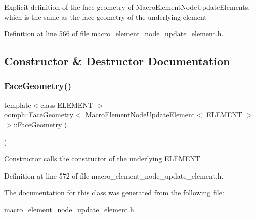 Explicit definition of the face geometry of Macro\+Element\+Node\+Update\+Elements, which is the same as the face geometry of the underlying element 

Definition at line 566 of file macro\+\_\+element\+\_\+node\+\_\+update\+\_\+element.\+h.



\subsection{Constructor \& Destructor Documentation}
\mbox{\label{classoomph_1_1FaceGeometry_3_01MacroElementNodeUpdateElement_3_01ELEMENT_01_4_01_4_ad3564b71b390c570eb97ae069f9b8def}} 
\subsubsection{\texorpdfstring{Face\+Geometry()}{FaceGeometry()}}
{\footnotesize\ttfamily template$<$class E\+L\+E\+M\+E\+NT $>$ \\
\hyperlink{classoomph_1_1FaceGeometry}{oomph\+::\+Face\+Geometry}$<$ \hyperlink{classoomph_1_1MacroElementNodeUpdateElement}{Macro\+Element\+Node\+Update\+Element}$<$ E\+L\+E\+M\+E\+NT $>$ $>$\+::\hyperlink{classoomph_1_1FaceGeometry}{Face\+Geometry} (\begin{DoxyParamCaption}{ }\end{DoxyParamCaption})\hspace{0.3cm}{\ttfamily [inline]}}



Constructor calls the constructor of the underlying E\+L\+E\+M\+E\+NT. 



Definition at line 572 of file macro\+\_\+element\+\_\+node\+\_\+update\+\_\+element.\+h.



The documentation for this class was generated from the following file\+:\begin{DoxyCompactItemize}
\item 
\hyperlink{macro__element__node__update__element_8h}{macro\+\_\+element\+\_\+node\+\_\+update\+\_\+element.\+h}\end{DoxyCompactItemize}
